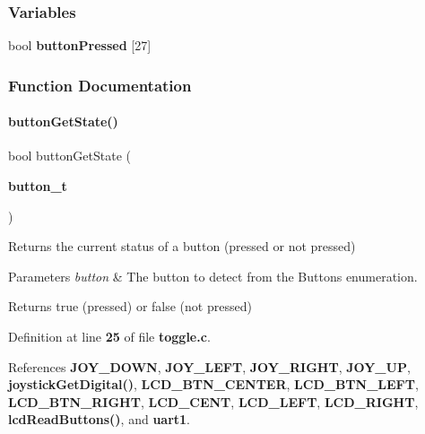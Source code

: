 \subsubsection*{Variables}
\begin{DoxyCompactItemize}
\item 
bool \textbf{ button\+Pressed} [27]
\end{DoxyCompactItemize}


\subsubsection{Function Documentation}
\mbox{\label{toggle_8c_ad2b7c969a01f85d57bdca0bc7f5cff81}} 
\paragraph{button\+Get\+State()}
{\footnotesize\ttfamily bool button\+Get\+State (\begin{DoxyParamCaption}\item[{\textbf{ button\+\_\+t}}]{ }\end{DoxyParamCaption})}



Returns the current status of a button (pressed or not pressed) 


\begin{DoxyParams}{Parameters}
{\em button} & The button to detect from the Buttons enumeration.\\
\hline
\end{DoxyParams}
\begin{DoxyReturn}{Returns}
true (pressed) or false (not pressed) 
\end{DoxyReturn}


Definition at line \textbf{ 25} of file \textbf{ toggle.\+c}.



References \textbf{ J\+O\+Y\+\_\+\+D\+O\+WN}, \textbf{ J\+O\+Y\+\_\+\+L\+E\+FT}, \textbf{ J\+O\+Y\+\_\+\+R\+I\+G\+HT}, \textbf{ J\+O\+Y\+\_\+\+UP}, \textbf{ joystick\+Get\+Digital()}, \textbf{ L\+C\+D\+\_\+\+B\+T\+N\+\_\+\+C\+E\+N\+T\+ER}, \textbf{ L\+C\+D\+\_\+\+B\+T\+N\+\_\+\+L\+E\+FT}, \textbf{ L\+C\+D\+\_\+\+B\+T\+N\+\_\+\+R\+I\+G\+HT}, \textbf{ L\+C\+D\+\_\+\+C\+E\+NT}, \textbf{ L\+C\+D\+\_\+\+L\+E\+FT}, \textbf{ L\+C\+D\+\_\+\+R\+I\+G\+HT}, \textbf{ lcd\+Read\+Buttons()}, and \textbf{ uart1}.



